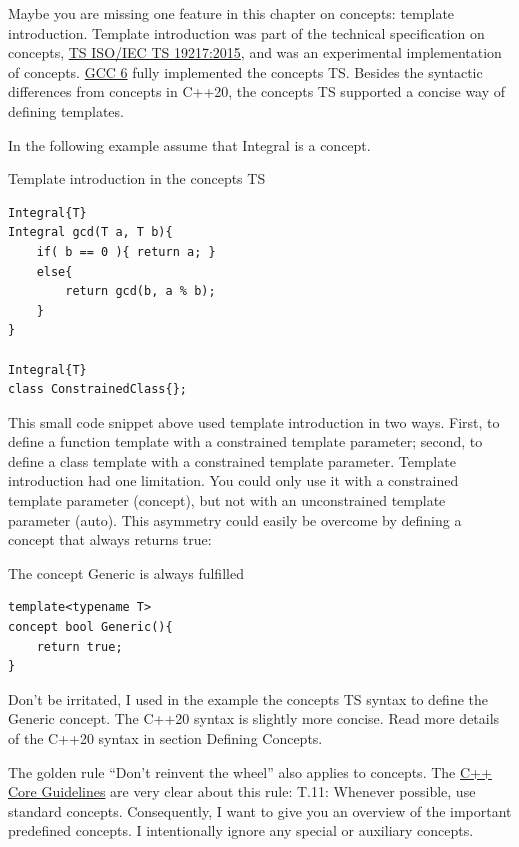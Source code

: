 \begin{tcolorbox}[colback=blue!5!white,colframe=blue!75!black,title=What we don’t get: Template Introduction]
Maybe you are missing one feature in this chapter on concepts: template introduction. Template introduction was part of the technical specification on concepts, \href{https://www.iso.org/standard/64031.html}{TS ISO/IEC TS 19217:2015}, and was an experimental implementation of concepts. \href{https://en.wikipedia.org/wiki/GNU_Compiler_Collection}{GCC 6} fully implemented the concepts TS. Besides the syntactic differences from concepts in C++20, the concepts TS supported a concise way of defining templates.

In the following example assume that Integral is a concept.

\noindent
Template introduction in the concepts TS
\begin{lstlisting}[style=styleCXX]
Integral{T}
Integral gcd(T a, T b){
	if( b == 0 ){ return a; }
	else{
		return gcd(b, a % b);
	}
}

Integral{T}
class ConstrainedClass{};
\end{lstlisting}

This small code snippet above used template introduction in two ways. First, to define a function template with a constrained template parameter; second, to define a class template with a constrained template parameter. Template introduction had one limitation. You could only use it with a constrained template parameter (concept), but not with an unconstrained template parameter (auto). This asymmetry could easily be overcome by defining a concept that always returns true: 

\noindent
The concept Generic is always fulfilled
\begin{lstlisting}[style=styleCXX]
template<typename T>
concept bool Generic(){
	return true;
}
\end{lstlisting}

Don’t be irritated, I used in the example the concepts TS syntax to define the Generic concept. The C++20 syntax is slightly more concise. Read more details of the C++20 syntax in section Defining Concepts.
\end{tcolorbox}


The golden rule “Don’t reinvent the wheel” also applies to concepts. The \href{https://isocpp.github.io/CppCoreGuidelines/CppCoreGuidelines}{C++ Core Guidelines} are very clear about this rule: T.11: Whenever possible, use standard concepts. Consequently, I want to give you an overview of the important predefined concepts. I intentionally ignore any special or auxiliary concepts.

